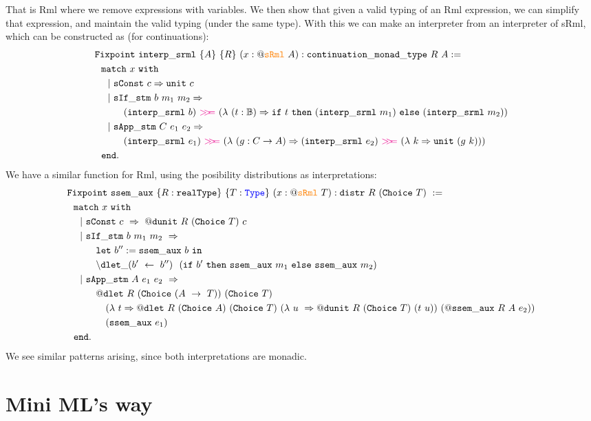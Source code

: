 \documentclass[11pt, leqno]{article}
\newcommand{\set}[1]{\{#1\}}
\newcommand{\sRml}{\textcolor{orange}{\mathtt{sRml}}}
\newcommand{\Type}{\textcolor{blue}{\mathtt{Type}}}
\newcommand{\bind}{\textcolor{magenta}{>\!\!>\!\!=}}
\begin{document}
That is Rml where we remove expressions with variables. We then show that given a valid typing of an Rml expression, we can simplify that expression, and maintain the valid typing (under the same type). With this we can make an interpreter from an interpreter of sRml, which can be constructed as (for continuations):
\begin{align*}  
  &\mathtt{Fixpoint}~\mathtt{interp\_srml}~\set{A}~\set{R}~(x : @\sRml~A) : \mathtt{continuation\_monad\_type}~R~A := \\
  &~~\mathtt{match}~x~\mathtt{with} \\
  &~~~~|~ \mathtt{sConst}~c \Rightarrow \mathtt{unit}~c \\
  &~~~~|~ \mathtt{sIf\_stm}~b~m_1~m_2 \Rightarrow \\
  & \qquad \quad (\mathtt{interp\_srml}~b)~\bind~(\lambda~(t : \mathbb{B}) \Rightarrow \mathtt{if}~t~\mathtt{then}~(\mathtt{interp\_srml}~m_1)~\mathtt{else}~(\mathtt{interp\_srml}~m_2)) \\
  &~~~~|~ \mathtt{sApp\_stm}~C~e_1~e_2 \Rightarrow \\
  & \qquad \quad (\mathtt{interp\_srml}~e_1)~\bind~(\lambda~(g : C \rightarrow A) \Rightarrow (\mathtt{interp\_srml}~e_2)~\bind~(\lambda~k \Rightarrow \mathtt{unit}~(g~k)))\\
  &~~\mathtt{end}.
\end{align*}
We have a similar function for Rml, using the posibility distributions as interpretations:
\begin{align*}
  &\mathtt{Fixpoint}~\mathtt{ssem\_aux}~\set{R : \mathtt{realType}}~\set{T : \Type}~(x : @\sRml~T) : \mathtt{distr}~R~(\mathtt{Choice}~T)~:=\\
  &~~\mathtt{match}~x~\mathtt{with}\\
  &~~~~|~\mathtt{sConst}~c~\Rightarrow~@\mathtt{dunit}~R~(\mathtt{Choice}~T)~c\\
  &~~~~|~\mathtt{sIf\_stm}~b~m_1~m_2~\Rightarrow\\
  & \qquad \quad \mathtt{let}~b'':= \mathtt{ssem\_aux}~b~\mathtt{in}\\
  & \qquad \quad \backslash\mathtt{dlet}\_(b'~\leftarrow~b'')~~(\mathtt{if}~b'~\mathtt{then}~\mathtt{ssem\_aux}~m_1~\mathtt{else}~\mathtt{ssem\_aux}~m_2)\\
  &~~~~|~\mathtt{sApp\_stm}~A~e_1~e_2~\Rightarrow\\
  & \qquad \quad @\mathtt{dlet}~R~(\mathtt{Choice}~(A~\rightarrow~T))~(\mathtt{Choice}~T)~\\
  &~\qquad~\quad~(\lambda~t \Rightarrow @\mathtt{dlet}~R~(\mathtt{Choice}~A)~(\mathtt{Choice}~T)~(\lambda~u~\Rightarrow @\mathtt{dunit}~R~(\mathtt{Choice}~T)~(t~u))~(@\mathtt{ssem\_aux}~R~A~e_2))\\
  &~\qquad~\quad~(\mathtt{ssem\_aux}~e_1)\\
  &~~\mathtt{end}.
\end{align*}
We see similar patterns arising, since both interpretations are monadic.


\section{Mini ML's way}
\end{document}
